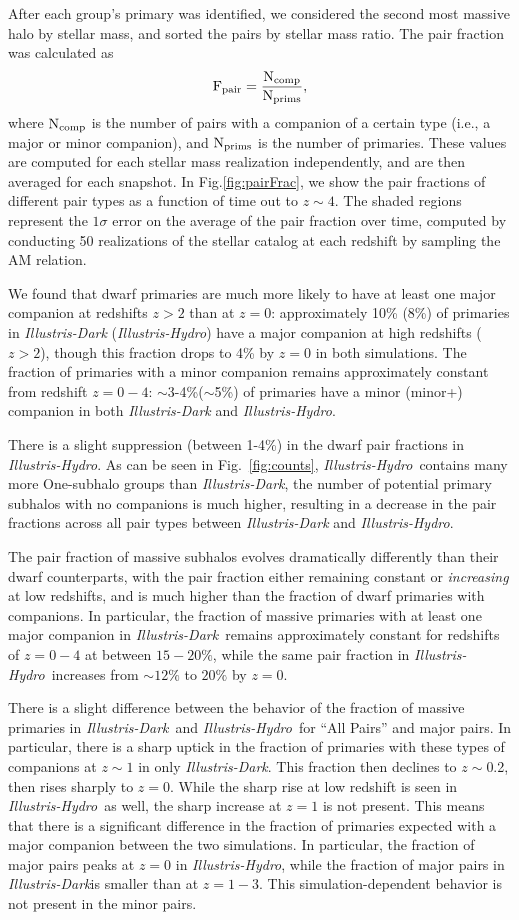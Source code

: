 \documentclass[twocolumn]{aastex63}
\newcommand\ID{\textit{Illustris-Dark}}
\newcommand\IH{\textit{Illustris-Hydro}}
\begin{document}
After each group's primary was identified, we considered the second most massive halo by stellar mass, and sorted the pairs by stellar mass ratio. The pair fraction was calculated as
$$\rm F_{pair} = \frac{\rm N_{comp}}{\rm N_{prims}},$$
where $\rm N_{comp}$ is the number of pairs with a companion of a certain type (i.e., a major or minor companion), and $\rm N_{prims}$ is the number of primaries. These values are computed for each stellar mass realization independently, and are then averaged for each snapshot. In Fig.\ref{fig:pairFrac}, we show the pair fractions of different pair types as a function of time out to $z\sim4$. The shaded regions represent the $1\sigma$ error on the average of the pair fraction over time, computed by conducting 50 realizations of the stellar catalog at each redshift by sampling the AM relation. 

We found that dwarf primaries are much more likely to have at least one major companion at redshifts $z>2$ than at $z=0$: approximately 10\% (8\%) of primaries in \textit{Illustris-Dark} (\textit{Illustris-Hydro}) have a major companion at high redshifts ($z>2$), though this fraction drops to 4\% by $z=0$ in both simulations. The fraction of primaries with a minor companion remains approximately constant from redshift $z=0-4$: $\sim$3-4\%($\sim$5\%) of primaries have a minor (minor+) companion in both \textit{Illustris-Dark} and \textit{Illustris-Hydro}. 

There is a slight suppression (between 1-4\%) in the dwarf pair fractions in \IH. As can be seen in Fig.~\ref{fig:counts}, \IH\ contains many more One-subhalo groups than \ID, the number of potential primary subhalos with no companions is much higher, resulting in a decrease in the pair fractions across all pair types between \textit{Illustris-Dark} and \IH.

The pair fraction of massive subhalos evolves dramatically differently than their dwarf counterparts, with the pair fraction either remaining constant or \textit{increasing} at low redshifts, and is much higher than the fraction of dwarf primaries with companions. In particular, the fraction of massive primaries with at least one major companion in \ID\ remains approximately constant for redshifts of $z=0-4$ at between $15-20\%$, while the same pair fraction in \IH\ increases from $\sim12\%$ to $20\%$ by $z=0$. 

There is a slight difference between the behavior of the fraction of massive primaries in \ID\ and \IH\ for ``All Pairs'' and major pairs. In particular, there is a sharp uptick in the fraction of primaries with these types of companions at $z\sim1$ in only \ID. This fraction then declines to $z\sim$0.2, then rises sharply to $z=0$. While the sharp rise at low redshift is seen in \IH\ as well, the sharp increase at $z=1$ is not present. This means that there is a significant difference in the fraction of primaries expected with a major companion between the two simulations. In particular, the fraction of major pairs peaks at $z=0$ in \IH, while the fraction of major pairs in \ID is smaller than at $z=1-3$. This simulation-dependent behavior is not present in the minor pairs.
\end{document}

